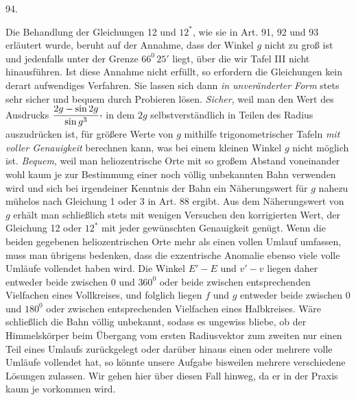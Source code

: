 \par{}\medskip
\hypertarget{native-127-article094}{}
\begin{center}94.\end{center}
Die Behandlung der Gleichungen 12 und $12^{\ast}$, wie sie in Art. 91, 92 und 93 erläutert wurde, beruht auf der Annahme, dass der Winkel $g$ nicht zu groß ist und jedenfalls unter der Grenze $66^0\,25'$ liegt, über die wir Tafel III nicht hinausführen. Ist diese Annahme nicht erfüllt, so erfordern die Gleichungen kein derart aufwendiges Verfahren. Sie lassen sich dann \textit{in unveränderter Form} stets sehr sicher und bequem durch Probieren lösen. \textit{Sicher}, weil man den Wert des Ausdrucks $\dfrac{2g-\sin 2g}{\sin g^3}\mathpunct{\raisebox{.45ex}{,}}$ in dem $2g$ selbstverständlich in Teilen des Radius auszudrücken ist, für größere Werte von $g$ mithilfe trigonometrischer Tafeln \textit{mit voller Genauigkeit} berechnen kann, was bei einem kleinen Winkel $g$ nicht möglich ist. \textit{Bequem}, weil man heliozentrische Orte mit so großem Abstand voneinander wohl kaum je zur Bestimmung einer noch völlig unbekannten Bahn verwenden wird und sich bei irgendeiner Kenntnis der Bahn ein Näherungswert für $g$ nahezu mühelos nach Gleichung 1 oder 3 in Art. 88 ergibt. Aus dem Näherungswert von $g$ erhält man schließlich stets mit wenigen Versuchen den korrigierten Wert, der Gleichung 12 oder $12^{\ast}$ mit jeder gewünschten Genauigkeit genügt. Wenn die beiden gegebenen heliozentrischen Orte mehr als einen vollen Umlauf umfassen, muss man übrigens bedenken, dass die exzentrische Anomalie ebenso viele volle Umläufe vollendet haben wird. Die Winkel $E'-E$ und $v'-v$ liegen daher entweder beide zwischen 0 und $360^0$ oder beide zwischen entsprechenden Vielfachen eines Vollkreises, und folglich liegen $f$ und $g$ entweder beide zwischen 0 und $180^0$ oder zwischen entsprechenden Vielfachen eines Halbkreises. Wäre schließlich die Bahn völlig unbekannt, sodass es ungewiss bliebe, ob der Himmelskörper beim Übergang vom ersten Radiusvektor zum zweiten nur einen Teil eines Umlaufs zurückgelegt oder darüber hinaus einen oder mehrere volle Umläufe vollendet hat, so könnte unsere Aufgabe bisweilen mehrere verschiedene Lösungen zulassen. Wir gehen hier über diesen Fall hinweg, da er in der Praxis kaum je vorkommen wird.
